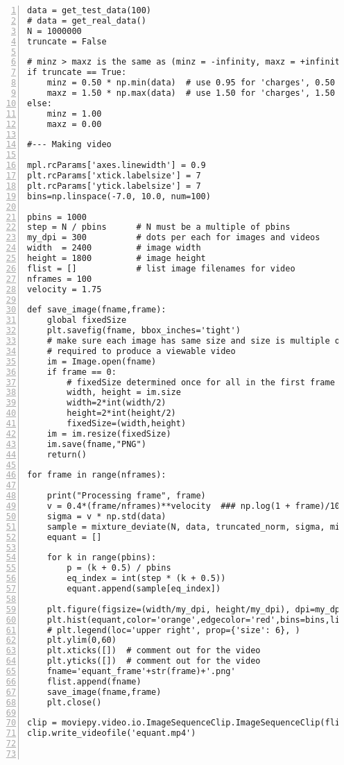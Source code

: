 \documentclass[oneside,10pt]{book}
\begin{document}
\begin{lstlisting}[numbers=left]
data = get_test_data(100)
# data = get_real_data()
N = 1000000
truncate = False

# minz > maxz is the same as (minz = -infinity, maxz = +infinity)
if truncate == True:
    minz = 0.50 * np.min(data)  # use 0.95 for 'charges', 0.50 for 'bmi'
    maxz = 1.50 * np.max(data)  # use 1.50 for 'charges', 1.50 for 'bmi'
else:
    minz = 1.00
    maxz = 0.00

#--- Making video

mpl.rcParams['axes.linewidth'] = 0.9
plt.rcParams['xtick.labelsize'] = 7
plt.rcParams['ytick.labelsize'] = 7
bins=np.linspace(-7.0, 10.0, num=100)

pbins = 1000
step = N / pbins      # N must be a multiple of pbins
my_dpi = 300          # dots per each for images and videos 
width  = 2400         # image width
height = 1800         # image height
flist = []            # list image filenames for video
nframes = 100 
velocity = 1.75

def save_image(fname,frame):
    global fixedSize
    plt.savefig(fname, bbox_inches='tight')    
    # make sure each image has same size and size is multiple of 2
    # required to produce a viewable video   
    im = Image.open(fname)
    if frame == 0:  
        # fixedSize determined once for all in the first frame
        width, height = im.size
        width=2*int(width/2)
        height=2*int(height/2)
        fixedSize=(width,height)
    im = im.resize(fixedSize) 
    im.save(fname,"PNG")
    return()

for frame in range(nframes):

    print("Processing frame", frame)
    v = 0.4*(frame/nframes)**velocity  ### np.log(1 + frame)/100
    sigma = v * np.std(data) 
    sample = mixture_deviate(N, data, truncated_norm, sigma, minz, maxz)
    equant = []

    for k in range(pbins):
        p = (k + 0.5) / pbins
        eq_index = int(step * (k + 0.5))
        equant.append(sample[eq_index])

    plt.figure(figsize=(width/my_dpi, height/my_dpi), dpi=my_dpi)
    plt.hist(equant,color='orange',edgecolor='red',bins=bins,linewidth=0.3,label='v=%6.4f' %v)
    # plt.legend(loc='upper right', prop={'size': 6}, ) 
    plt.ylim(0,60)
    plt.xticks([])  # comment out for the video
    plt.yticks([])  # comment out for the video
    fname='equant_frame'+str(frame)+'.png'
    flist.append(fname)
    save_image(fname,frame)
    plt.close()

clip = moviepy.video.io.ImageSequenceClip.ImageSequenceClip(flist, fps=10)
clip.write_videofile('equant.mp4')



\end{lstlisting}
\end{document}
